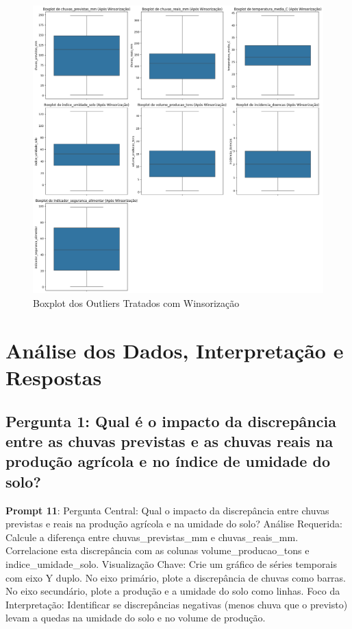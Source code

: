 \documentclass[12pt, a4paper, onecolumn]{article}
\begin{document}
\begin{itemize}
        \begin{figure}[htbp]
            \centering
            \includegraphics[width=1\textwidth]{figures/boxplot_outliers_winsorized.png}
            \caption{Boxplot dos Outliers Tratados com Winsorização}
            \label{fig:boxplot_outliers_winsori
            zed}
        \end{figure}
    \end{itemize}

    \section{Análise dos Dados, Interpretação e Respostas}
    \subsection*{Pergunta 1: Qual é o impacto da discrepância entre as chuvas previstas e as chuvas reais na produção agrícola e no índice de umidade do solo?}
    \textbf{Prompt 11}: Pergunta Central: Qual o impacto da discrepância entre chuvas previstas e reais na produção agrícola e na umidade do solo? Análise Requerida: Calcule a diferença entre chuvas\_previstas\_mm e chuvas\_reais\_mm. Correlacione esta discrepância com as colunas volume\_producao\_tons e indice\_umidade\_solo. Visualização Chave: Crie um gráfico de séries temporais com eixo Y duplo. No eixo primário, plote a discrepância de chuvas como barras. No eixo secundário, plote a produção e a umidade do solo como linhas. Foco da Interpretação: Identificar se discrepâncias negativas (menos chuva que o previsto) levam a quedas na umidade do solo e no volume de produção.
\end{document}
